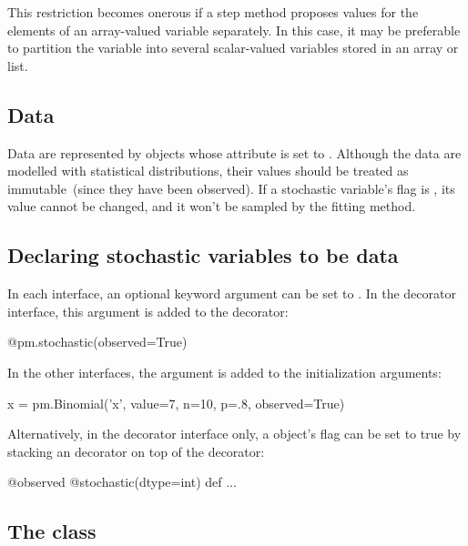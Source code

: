 \documentclass[]{jss}
\begin{document}
This restriction becomes onerous if a step method proposes values for the elements of an array-valued variable separately. In this case, it may be preferable to partition the variable into several scalar-valued variables stored in an array or list.


\subsection{Data} \label{data}


Data are represented by  objects whose  attribute is set to . Although the data are modelled with statistical distributions, their values should be treated as immutable~(since they have been observed). If a stochastic variable's  flag is , its value cannot be changed, and it won't be sampled by the fitting method.

\subsection{Declaring stochastic variables to be data}

In each interface, an optional keyword argument  can be set to . In the decorator interface, this argument is added to the  decorator:

\begin{CodeInput}
@pm.stochastic(observed=True)
\end{CodeInput}

In the other interfaces, the  argument is added to the initialization arguments:

\begin{CodeInput}
x = pm.Binomial('x', value=7, n=10, p=.8, observed=True)
\end{CodeInput}

Alternatively, in the decorator interface only, a  object's  flag can be set to true by stacking an  decorator on top of the  decorator:
\begin{CodeInput}
@observed
@stochastic(dtype=int)
    def ...
\end{CodeInput}


\subsection[The Deterministic class]{The  class}
\label{deterministic}
\end{document}
